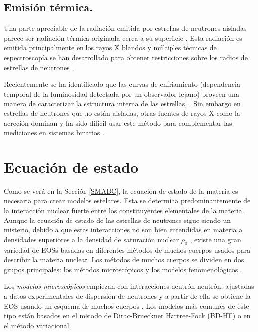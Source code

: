 \subsection{Emisión térmica.}

\noindent Una parte apreciable de la radiación emitida por estrellas de neutrones aisladas parece ser radiación térmica originada cerca a su superficie \cite{Potekhin2010}. Esta radiación es emitida principalmente en los rayos X blandos y múltiples técnicas de espectroscopía se han desarrollado para obtener restricciones sobre los radios de estrellas de neutrones \cite{Ozel2016}.


Recientemente se ha identificado que las curvas de enfriamiento (dependencia temporal de la luminosidad detectada por un observador lejano) proveen una manera de caracterizar la estructura interna de las estrellas, \cite{Yakovlev2004}. Sin embargo en estrellas de neutrones que no están aisladas, otras fuentes de rayos X como la acreción dominan y ha sido difícil usar este método para complementar las mediciones en sistemas binarios \cite{Potekhin2010}.


\section{Ecuación de estado}\label{EOS}

\noindent Como se verá en la Sección \ref{SMABC}, la ecuación de estado de la materia es necesaria para crear modelos estelares. Esta se determina predominantemente de la interacción nuclear fuerte entre los constituyentes elementales de la materia. Aunque la ecuación de estado de las estrellas de neutrones sigue siendo un misterio, debido a que estas interacciones no son bien entendidas en materia a densidades superiores a la densidad de saturación nuclear $\rho_0$ \cite{Haensel2007}, existe una gran variedad de EOSs basadas en diferentes métodos de muchos cuerpos usados para describir la materia nuclear. Los métodos de muchos cuerpos se dividen en dos grupos principales: los métodos microscópicos y los modelos fenomenológicos \cite{Rezzolla2018,Giai2010}.

Los \emph{modelos microscópicos} empiezan con interacciones neutrón-neutrón, ajustadas a datos experimentales de dispersión de neutrones y a partir de ella se obtiene la EOS usando un esquema de muchos cuerpos \cite{Ring1980}. Los modelos más comunes de este tipo están basados en el método de Dirac-Brueckner Hartree-Fock (BD-HF) o en el método variacional.

